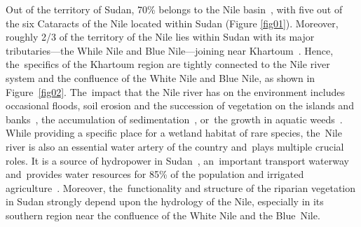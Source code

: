 \documentclass[jimaging,article,accept,pdftex,moreauthors]{Definitions/mdpi}
\begin{document}
Out of the territory of Sudan, 70\%  belongs to the Nile basin~\cite{Melesse}, with five out of the six Cataracts of the Nile located within Sudan (Figure \ref{fig01}). Moreover, roughly 2/3 of the territory of the Nile lies within Sudan with its major tributaries---the While Nile and Blue Nile---joining near Khartoum~\cite{Hamad}. Hence, the~specifics of the Khartoum region are tightly connected to the Nile river system and the confluence of the White Nile and Blue Nile, as shown in Figure~\ref{fig02}. The~impact that the Nile river has on the environment includes occasional floods, soil erosion and the succession of vegetation on the islands and banks~\cite{Halwagy}, the accumulation of sedimentation~\cite{BILLI201012}, or~the growth in aquatic weeds~\cite{PACINI2016242}. While providing a specific place for a wetland habitat of rare species, the~Nile river is also an essential water artery of the country and~plays multiple crucial roles. It is a source of hydropower in Sudan~\cite{AYIK20232229}, an~important transport waterway and~provides water resources for 85\% of the population and irrigated agriculture~\cite{Kauetal2023}. Moreover, the~functionality and structure of the riparian vegetation in Sudan strongly depend upon the hydrology of the Nile, especially in its southern region near the confluence of the White Nile and the Blue~Nile.
\end{document}
